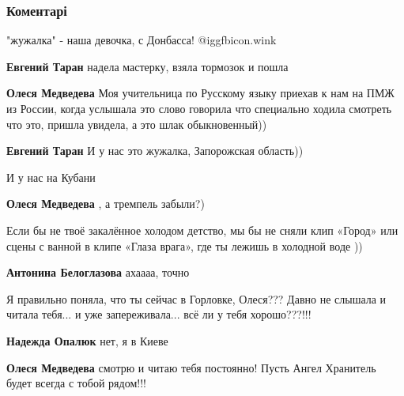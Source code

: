 
 
 
 
 
\subsubsection{Коментарі}

\begin{itemize} %
"жужалка" - наша девочка, с Донбасса!  @igg{fbicon.wink} 

\begin{itemize} %
\textbf{Евгений Таран} надела мастерку, взяла тормозок и пошла

\textbf{Олеся Медведева} Моя учительница по Русскому языку приехав к нам на ПМЖ из России, когда услышала это слово говорила что специально ходила смотреть что это, пришла увидела, а это шлак обыкновенный))

\textbf{Евгений Таран} И у нас это жужалка, Запорожская область))

И у нас на Кубани

\textbf{Олеся Медведева} , а тремпель забыли?)
\end{itemize} %


Если бы не твоё закалённое холодом детство, мы бы не сняли клип «Город» или
сцены с ванной в клипе «Глаза врага», где ты лежишь в холодной воде ))

\textbf{Антонина Белоглазова} ахаааа, точно


Я правильно поняла, что ты сейчас в Горловке, Олеся???
Давно не слышала и читала тебя... и уже запереживала... всё ли у тебя хорошо???!!!

\begin{itemize} %
\textbf{Надежда Опалюк} нет, я в Киеве

\textbf{Олеся Медведева} смотрю и читаю тебя постоянно!
Пусть Ангел Хранитель будет всегда с тобой рядом!!!



\end{itemize}
\end{itemize}
